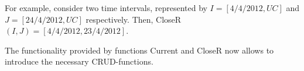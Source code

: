 For example, consider two time intervals, represented by $I = \left[4/4/2012, UC \right]$ and $J = \left[24/4/2012, UC \right]$ respectively. Then, CloseR$\left(I, J \right) = \left[4/4/2012, 23/4/2012 \right]$.








%



The functionality provided by functions Current and CloseR now allows to introduce the necessary CRUD-functions.




